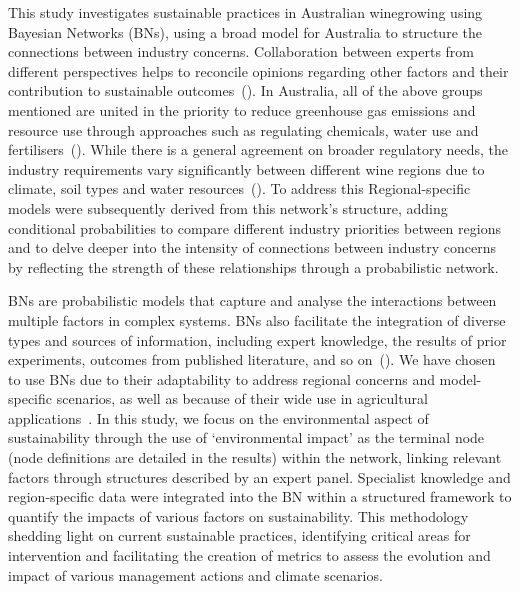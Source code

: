 \documentclass[10pt,letterpaper]{article}
\begin{document}
This study investigates sustainable practices in Australian winegrowing using Bayesian Networks (BNs), using a broad model for Australia to structure the connections between industry concerns. Collaboration between experts from different perspectives helps to reconcile opinions regarding other factors and their contribution to sustainable outcomes~(\cite{dichiaraCollaborativeApproachAchieving2024}). In Australia, all of the above groups mentioned are united in the priority to reduce greenhouse gas emissions and resource use through approaches such as regulating chemicals, water use and fertilisers~(\cite{dumbrellComparingAustralianPublic2024}). While there is a general agreement on broader regulatory needs, the industry requirements vary significantly between different wine regions due to climate, soil types and water resources~(\cite{abbalDecisionSupportSystem2016,agostaRegionalClimateVariability2012}). To address this Regional-specific models were subsequently derived from this network's structure, adding conditional probabilities to compare different industry priorities between regions and to delve deeper into the intensity of connections between industry concerns by reflecting the strength of these relationships through a probabilistic network. 

BNs are probabilistic models that capture and analyse the interactions between multiple factors in complex systems. BNs also facilitate the integration of diverse types and sources of information, including expert knowledge, the results of prior experiments, outcomes from published literature, and so on~(\cite{korbBayesianArtificialIntelligence2011}). We have chosen to use BNs due to their adaptability to address regional concerns and model-specific scenarios, as well as because of their wide use in agricultural applications~\cite{abbalDecisionSupportSystem2016, carmonaUseParticipatoryObjectOriented2011, luDiseaseRiskForecasting2020, barton2008bayesian, cain2001planning}. In this study, we focus on the environmental aspect of sustainability through the use of `environmental impact' as the terminal node (node definitions are detailed in the results) within the network, linking relevant factors through structures described by an expert panel. Specialist knowledge and region-specific data were integrated into the BN within a structured framework to quantify the impacts of various factors on sustainability. This methodology shedding light on current sustainable practices, identifying critical areas for intervention and facilitating the creation of metrics to assess the evolution and impact of various management actions and climate scenarios.
\end{document}
